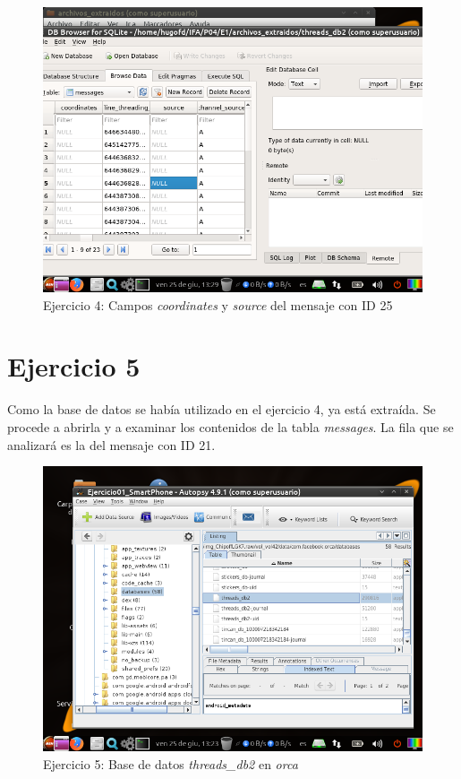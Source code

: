 \documentclass[11pt]{article}
\begin{document}
\begin{figure}[H]
    \caption{Ejercicio 4: Campos \textit{coordinates} y \textit{source} del mensaje con ID 25}
    \centering
    \includegraphics[scale=0.7]{e4-7.png}
\end{figure}

\section{Ejercicio 5}
Como la base de datos se había utilizado en el ejercicio 4, ya está extraída. Se procede a abrirla y a examinar los contenidos de la tabla \textit{messages}. La fila que se analizará es la del mensaje con ID 21.

\begin{figure}[H]
    \caption{Ejercicio 5: Base de datos \textit{threads\_db2} en \textit{orca}}
    \centering
    \includegraphics[scale=0.7]{e4-2.png}
\end{figure}
\end{document}
